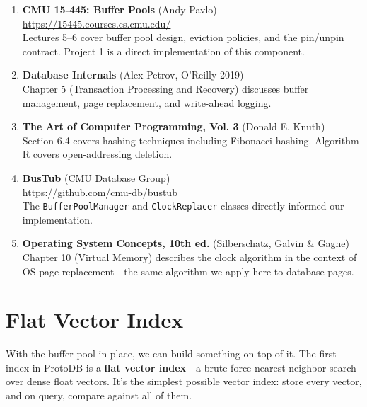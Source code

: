 \documentclass[12pt, a4paper]{report}
\begin{document}
\begin{enumerate}[itemsep=6pt]
    \item \textbf{CMU 15-445: Buffer Pools} (Andy Pavlo)\\
          \url{https://15445.courses.cs.cmu.edu/}\\
          Lectures 5--6 cover buffer pool design, eviction policies, and
          the pin/unpin contract. Project 1 is a direct implementation
          of this component.

    \item \textbf{Database Internals} (Alex Petrov, O'Reilly 2019)\\
          Chapter 5 (Transaction Processing and Recovery) discusses
          buffer management, page replacement, and write-ahead logging.

    \item \textbf{The Art of Computer Programming, Vol. 3}
          (Donald E. Knuth)\\
          Section 6.4 covers hashing techniques including Fibonacci
          hashing. Algorithm R covers open-addressing deletion.

    \item \textbf{BusTub} (CMU Database Group)\\
          \url{https://github.com/cmu-db/bustub}\\
          The \texttt{BufferPoolManager} and \texttt{ClockReplacer}
          classes directly informed our implementation.

    \item \textbf{Operating System Concepts, 10th ed.}
          (Silberschatz, Galvin \& Gagne)\\
          Chapter 10 (Virtual Memory) describes the clock algorithm
          in the context of OS page replacement---the same algorithm
          we apply here to database pages.
\end{enumerate}


\chapter{Flat Vector Index}

With the buffer pool in place, we can build something on top of it. The first
index in ProtoDB is a \textbf{flat vector index}---a brute-force nearest
neighbor search over dense float vectors. It's the simplest possible vector
index: store every vector, and on query, compare against all of them.
\end{document}
